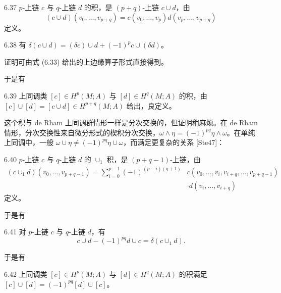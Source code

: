 \begin{definition}{6.37}
  $p$-上链 $c$ 与 $q$-上链 $d$ 的积，是 $(p+q)$-上链 $c\cup d$，由
  \begin{equation}
    (c\cup d)(v_0,\dots,v_{p+q})=c(v_0,\dots,v_p)d(v_p,\dots,v_{p+q})
    \tag{6.34}
  \end{equation}
  定义。
\end{definition}

\begin{proposition}{6.38}
  有 $\delta(c\cup d)=(\delta c)\cup d+(-1)^pc\cup(\delta d)$。
\end{proposition}

证明可由式 (6.33) 给出的上边缘算子形式直接得到。

于是有

\begin{proposition}{6.39}
  上同调类 $[c]\in H^p(M;A)$ 与 $[d]\in H^q(M;A)$ 的积，由 $[c]\cup[d]=[c\cup d]\in H^{p+q}(M;A)$ 给出，良定义。
\end{proposition}

这个积与 de Rham 上同调群情形一样是分次交换的，但证明稍麻烦。在 de Rham 情形，分次交换性来自微分形式的楔积分次交换，$\omega\wedge\eta=(-1)^{pq}\eta\wedge\omega$。在单纯上同调中，一般 $\omega\cup\eta\ne(-1)^{pq}\eta\cup\omega$，而满足更复杂的关系 [Ste47]：

\begin{definition}{6.40}
  $p$-上链 $c$ 与 $q$-上链 $d$ 的 $\cup_1$ 积，是 $(p+q-1)$-上链，由
  \begin{equation}
    \begin{aligned}
      (c\cup_1d)(v_0,\dots,v_{p+q-1})
      =\sum_{i=0}^{p-1}(-1)^{(p-i)(q+1)}
      &c(v_0,\dots,v_i,v_{i+q},\dots,v_{p+q-1})\\
      &\cdot d(v_i,\dots,v_{i+q})
    \end{aligned}
    \tag{6.35}
  \end{equation}
  定义。
\end{definition}

于是有

\begin{proposition}{6.41}
  对 $p$-上链 $c$ 与 $q$-上链 $d$，有
  \begin{equation}
    c\cup d-(-1)^{pq}d\cup c=\delta(c\cup_1d).
    \tag{6.36}
  \end{equation}
\end{proposition}

于是有

\begin{corollary}{6.42}
  上同调类 $[c]\in H^p(M;A)$ 与 $[d]\in H^q(M;A)$ 的积满足 $[c]\cup[d]=(-1)^{pq}[d]\cup[c]$。
\end{corollary}

